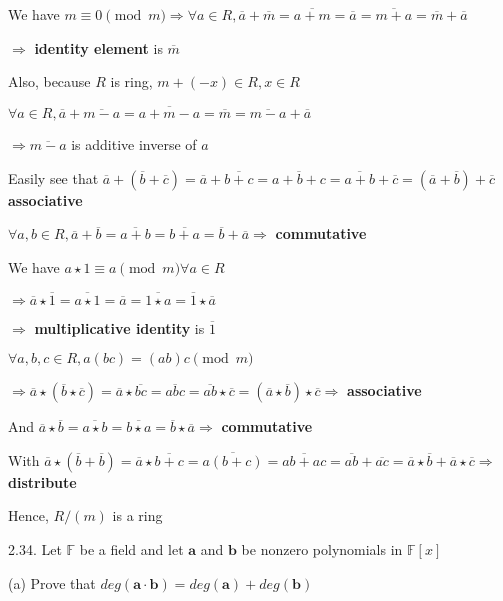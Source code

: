 We have $m \equiv 0 \pmod m \Rightarrow \forall a \in R, \overline{a} + \overline{m} = \overline{a+m} = \overline{a} = \overline{m+a} = \overline{m} + \overline{a}$

$\Rightarrow$ \textbf{identity element} is $\overline{m}$

Also, because $R$ is ring, $m+(-x) \in R, x \in R$

$\forall a \in R, \overline{a} + \overline{m-a} = \overline{a + m - a} = \overline{m} = \overline{m-a} + \overline{a}$

$\Rightarrow \overline{m-a}$ is additive inverse of $a$

Easily see that $\overline{a} + (\overline{b}+\overline{c}) = \overline{a} + \overline{b+c} = \overline{a+b+c} = \overline{a+b} + \overline{c} = (\overline{a}+\overline{b})+\overline{c}$ \textbf{associative}

$\forall a, b \in R, \overline{a}+\overline{b}=\overline{a+b}=\overline{b+a}=\overline{b}+\overline{a} \Rightarrow$  \textbf{commutative} 

We have $a \star 1 \equiv a \pmod m \forall a \in R$

$\Rightarrow \overline{a} \star \overline{1} = \overline{a \star 1} = \overline{a} = \overline{1 \star a} = \overline{1} \star \overline{a}$

$\Rightarrow$ \textbf{multiplicative identity} is $\overline{1}$

$\forall a, b, c \in R, a(bc)=(ab)c \pmod m$

$\Rightarrow \overline{a} \star (\overline{b} \star \overline{c}) = \overline{a} \star \overline{bc} = \overline{abc} = \overline{ab} \star \overline{c} = (\overline{a} \star \overline{b}) \star \overline{c} \Rightarrow$ \textbf{associative}

And $\overline{a} \star \overline{b} = \overline{a \star b} = \overline{b \star a} = \overline{b} \star \overline{a} \Rightarrow$ \textbf{commutative}

With $\overline{a} \star (\overline{b} + \overline{b}) = \overline{a} \star \overline{b + c} = \overline{a(b+c)} = \overline{ab + ac} = \overline{ab} + \overline{ac} = \overline{a} \star \overline{b} + \overline{a} \star \overline{c} \Rightarrow$ \textbf{distribute}

Hence, $R/(m)$ is a ring


2.34. Let $\mathbb{F}$ be a field and let $\mathbf{a}$ and $\mathbf{b}$ be nonzero polynomials in $\mathbb{F}[x]$

(a) Prove that $deg(\textbf{a} \cdot \textbf{b}) = deg(\textbf{a}) + deg(\textbf{b})$
    
